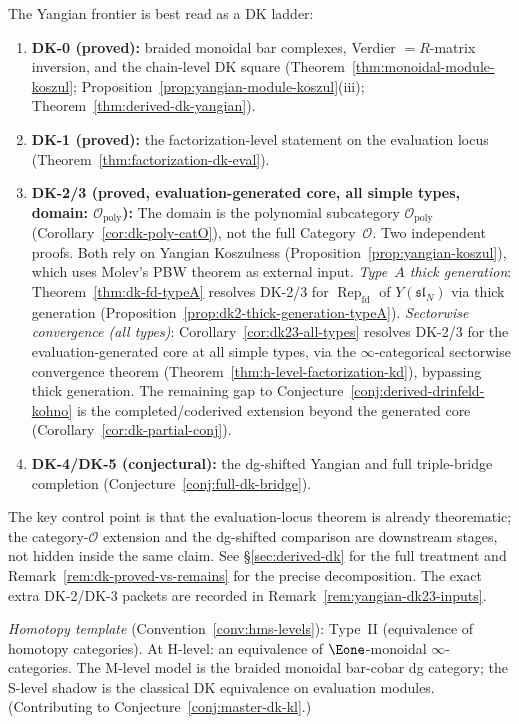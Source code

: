 \begin{remark}\label{rem:derived-dk-scope}
The Yangian frontier is best read as a DK ladder:
\begin{enumerate}[label=\textup{(\alph*)}]
\item \textbf{DK-0 (proved):} braided monoidal bar complexes,
  Verdier $= R$-matrix inversion, and the chain-level DK square
  (Theorem~\ref{thm:monoidal-module-koszul};
  Proposition~\ref{prop:yangian-module-koszul}(iii);
  Theorem~\ref{thm:derived-dk-yangian}).
\item \textbf{DK-1 (proved):} the factorization-level statement on the
  evaluation locus (Theorem~\ref{thm:factorization-dk-eval}).
\item \textbf{DK-2/3 (proved, evaluation-generated core, all simple types, domain: $\mathcal{O}_{\mathrm{poly}}$):}
  The domain is the polynomial subcategory
  $\mathcal{O}_{\mathrm{poly}}$
  (Corollary~\ref{cor:dk-poly-catO}), not the full
  Category~$\mathcal{O}$.
  Two independent proofs.  Both rely on Yangian Koszulness
  (Proposition~\ref{prop:yangian-koszul}), which uses Molev's PBW
  theorem \cite{molev-yangians} as external input.
  \emph{Type~$A$ thick generation}:
  Theorem~\ref{thm:dk-fd-typeA} resolves DK-2/3 for
  $\operatorname{Rep}_{\mathrm{fd}}$ of $Y(\mathfrak{sl}_N)$
  via thick generation
  (Proposition~\ref{prop:dk2-thick-generation-typeA}).
  \emph{Sectorwise convergence (all types)}:
  Corollary~\ref{cor:dk23-all-types} resolves DK-2/3
  for the evaluation-generated core at all
  simple types, via the $\infty$-categorical sectorwise
  convergence theorem
  (Theorem~\ref{thm:h-level-factorization-kd}), bypassing
  thick generation.  The remaining gap to
  Conjecture~\ref{conj:derived-drinfeld-kohno} is the
  completed/coderived extension beyond the generated core
  (Corollary~\ref{cor:dk-partial-conj}).
\item \textbf{DK-4/DK-5 (conjectural):} the dg-shifted Yangian and
  full triple-bridge completion
  (Conjecture~\ref{conj:full-dk-bridge}).
\end{enumerate}
The key control point is that the evaluation-locus theorem is already
theorematic; the category-$\mathcal{O}$ extension and the dg-shifted
comparison are downstream stages, not hidden inside the same claim.
See \S\ref{sec:derived-dk} for the full treatment and
Remark~\ref{rem:dk-proved-vs-remains} for the precise decomposition.
The exact extra DK-2/DK-3 packets are recorded in
Remark~\ref{rem:yangian-dk23-inputs}.

\emph{Homotopy template} (Convention~\ref{conv:hms-levels}): Type~II
(equivalence of homotopy categories).  At H-level: an equivalence of
$\Eone$-monoidal $\infty$-categories.  The M-level model is the braided
monoidal bar-cobar dg category; the S-level shadow is the classical DK
equivalence on evaluation modules.
(Contributing to Conjecture~\ref{conj:master-dk-kl}.)


\end{remark}
